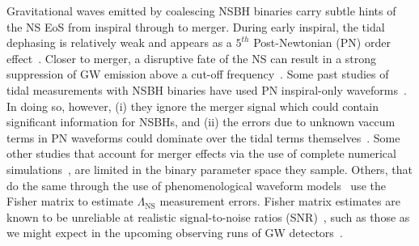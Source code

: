 \documentclass[aps,prd,amsmath,floats,floatfix, twocolumn,
superscriptaddress,nofootinbib,showpacs]{revtex4-1}
\newcommand{\red}{\textcolor{red}}
\newcommand{\lambdans}{\Lambda_\mathrm{NS}}
\begin{document}
% 

Gravitational waves emitted by coalescing NSBH binaries carry subtle hints of
the NS EoS from inspiral through to merger. During early inspiral, the tidal
dephasing is relatively weak and appears as a $5^{th}$ Post-Newtonian (PN)
order effect~\cite{Vines2011}. Closer to merger, a disruptive fate of the NS
can result in a strong suppression of GW emission above a cut-off 
frequency~\cite{Pannarale:2015jia}. Some past studies of tidal measurements
with NSBH binaries have used PN inspiral-only waveforms~\cite{Maselli:2013rza}.
In doing so, however, (i) they ignore the merger signal which could contain significant
information for NSBHs, and (ii) the errors due to unknown vaccum terms in PN 
waveforms could dominate over the tidal terms themselves~\cite{Barkett2015,
Yagi:2014}.
% 
Some other studies that account for merger effects via the use of complete
numerical simulations~\cite{Foucart:2013psa}, are limited in the binary
parameter space they sample.
% 
Others, that do the same through the use of phenomenological waveform
models~\cite{Lackey2011,Lackey:2013axa} use the Fisher matrix to estimate
$\lambdans$ measurement errors. Fisher matrix estimates are known to be
unreliable at realistic signal-to-noise ratios (SNR)~\cite{Vallisneri:2007ev},
such as those as we might expect in the upcoming observing runs of GW
detectors~\cite{Abadie:2010cf}.
\end{document}
